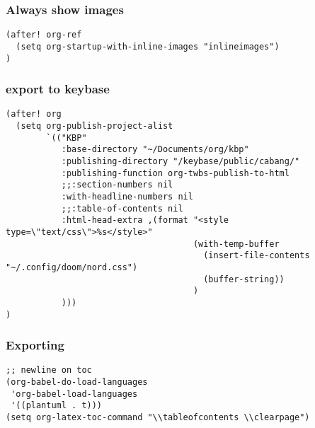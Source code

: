 \documentclass[11pt]{article}
\begin{document}
\subsubsection{Always show images}
\label{sec:orgacd705a}
\begin{verbatim}
(after! org-ref
  (setq org-startup-with-inline-images "inlineimages")
)
\end{verbatim}

\subsubsection{export to keybase}
\label{sec:org8e69d47}
\begin{verbatim}
(after! org
  (setq org-publish-project-alist
        `(("KBP"
           :base-directory "~/Documents/org/kbp"
           :publishing-directory "/keybase/public/cabang/"
           :publishing-function org-twbs-publish-to-html
           ;;:section-numbers nil
           :with-headline-numbers nil
           ;;:table-of-contents nil
           :html-head-extra ,(format "<style type=\"text/css\">%s</style>"
                                     (with-temp-buffer
                                       (insert-file-contents "~/.config/doom/nord.css")
                                       (buffer-string))
                                     )
           )))
)
\end{verbatim}
\subsubsection{Exporting}
\label{sec:org7628f1b}
\begin{verbatim}
;; newline on toc
(org-babel-do-load-languages
 'org-babel-load-languages
 '((plantuml . t)))
(setq org-latex-toc-command "\\tableofcontents \\clearpage")
\end{verbatim}
\end{document}
